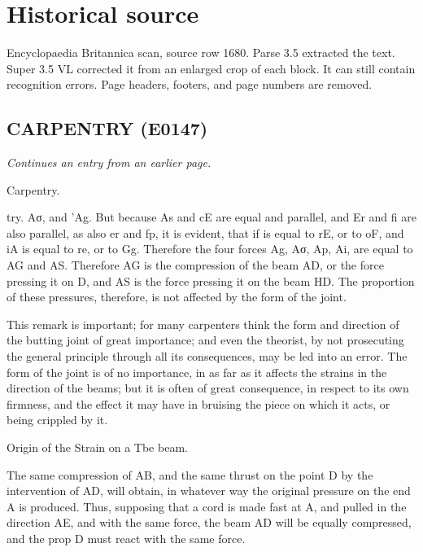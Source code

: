 \documentclass{article}
\begin{document}
\section*{Historical source}
Encyclopaedia Britannica scan, source row 1680. Parse 3.5 extracted the text. Super 3.5 VL corrected it from an enlarged crop of each block. It can still contain recognition errors.
Page headers, footers, and page numbers are removed.

\subsection*{CARPENTRY (E0147)}
\textit{Continues an entry from an earlier page.}

Carpentry.

try. Aσ, and 'Ag. But because As and cE are equal and parallel, and Er and fi are also parallel, as also er and fp, it is evident, that if is equal to rE, or to oF, and iA is equal to re, or to Gg. Therefore the four forces Ag, Aσ, Ap, Ai, are equal to AG and AS. Therefore AG is the compression of the beam AD, or the force pressing it on D, and AS is the force pressing it on the beam HD. The proportion of these pressures, therefore, is not affected by the form of the joint.

This remark is important; for many carpenters think the form and direction of the butting joint of great importance; and even the theorist, by not prosecuting the general principle through all its consequences, may be led into an error. The form of the joint is of no importance, in as far as it affects the strains in the direction of the beams; but it is often of great consequence, in respect to its own firmness, and the effect it may have in bruising the piece on which it acts, or being crippled by it.

Origin of the Strain on a Tbe beam.

The same compression of AB, and the same thrust on the point D by the intervention of AD, will obtain, in whatever way the original pressure on the end A is produced. Thus, supposing that a cord is made fast at A, and pulled in the direction AE, and with the same force, the beam AD will be equally compressed, and the prop D must react with the same force.
\end{document}
